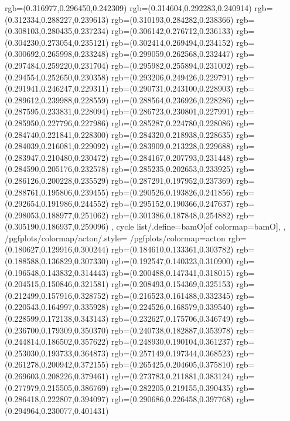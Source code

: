 {{{			rgb=(0.316977,0.296450,0.242309)
			rgb=(0.314604,0.292283,0.240914)
			rgb=(0.312334,0.288227,0.239613)
			rgb=(0.310193,0.284282,0.238366)
			rgb=(0.308103,0.280435,0.237234)
			rgb=(0.306142,0.276712,0.236133)
			rgb=(0.304230,0.273054,0.235121)
			rgb=(0.302414,0.269494,0.234152)
			rgb=(0.300692,0.265998,0.233248)
			rgb=(0.299059,0.262568,0.232447)
			rgb=(0.297484,0.259220,0.231704)
			rgb=(0.295982,0.255894,0.231002)
			rgb=(0.294554,0.252650,0.230358)
			rgb=(0.293206,0.249426,0.229791)
			rgb=(0.291941,0.246247,0.229311)
			rgb=(0.290731,0.243100,0.228903)
			rgb=(0.289612,0.239988,0.228559)
			rgb=(0.288564,0.236926,0.228286)
			rgb=(0.287595,0.233831,0.228094)
			rgb=(0.286723,0.230801,0.227991)
			rgb=(0.285950,0.227796,0.227986)
			rgb=(0.285287,0.224780,0.228086)
			rgb=(0.284740,0.221841,0.228300)
			rgb=(0.284320,0.218938,0.228635)
			rgb=(0.284039,0.216081,0.229092)
			rgb=(0.283909,0.213228,0.229688)
			rgb=(0.283947,0.210480,0.230472)
			rgb=(0.284167,0.207793,0.231448)
			rgb=(0.284590,0.205176,0.232578)
			rgb=(0.285235,0.202653,0.233925)
			rgb=(0.286126,0.200228,0.235529)
			rgb=(0.287291,0.197952,0.237369)
			rgb=(0.288761,0.195806,0.239455)
			rgb=(0.290526,0.193826,0.241856)
			rgb=(0.292654,0.191986,0.244552)
			rgb=(0.295152,0.190366,0.247637)
			rgb=(0.298053,0.188977,0.251062)
			rgb=(0.301386,0.187848,0.254882)
			rgb=(0.305190,0.186937,0.259096)
		},
	cycle list/.define={bamO}{[of colormap=bamO]},
	},
	/pgfplots/colormap/acton/.style={
		/pgfplots/colormap={acton}{%
			rgb=(0.180627,0.129916,0.300244)
			rgb=(0.184610,0.133361,0.303782)
			rgb=(0.188588,0.136829,0.307330)
			rgb=(0.192547,0.140323,0.310900)
			rgb=(0.196548,0.143832,0.314443)
			rgb=(0.200488,0.147341,0.318015)
			rgb=(0.204515,0.150846,0.321581)
			rgb=(0.208493,0.154369,0.325153)
			rgb=(0.212499,0.157916,0.328752)
			rgb=(0.216523,0.161488,0.332345)
			rgb=(0.220543,0.164997,0.335928)
			rgb=(0.224526,0.168579,0.339540)
			rgb=(0.228599,0.172138,0.343143)
			rgb=(0.232627,0.175706,0.346749)
			rgb=(0.236700,0.179309,0.350370)
			rgb=(0.240738,0.182887,0.353978)
			rgb=(0.244814,0.186502,0.357622)
			rgb=(0.248930,0.190104,0.361237)
			rgb=(0.253030,0.193733,0.364873)
			rgb=(0.257149,0.197344,0.368523)
			rgb=(0.261278,0.200942,0.372155)
			rgb=(0.265425,0.204605,0.375810)
			rgb=(0.269603,0.208226,0.379461)
			rgb=(0.273783,0.211881,0.383124)
			rgb=(0.277979,0.215505,0.386769)
			rgb=(0.282205,0.219155,0.390435)
			rgb=(0.286418,0.222807,0.394097)
			rgb=(0.290686,0.226458,0.397768)
			rgb=(0.294964,0.230077,0.401431)
}}}
